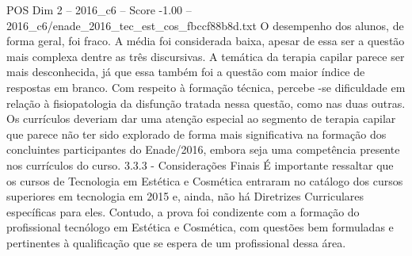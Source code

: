 \begin{textsample}{POS Dim 2 – 2016\_c6 – Score -1.00 – 2016\_c6/enade\_2016\_tec\_est\_cos\_fbccf88b8d.txt}
O desempenho dos alunos, de forma geral, foi fraco.
A média foi considerada baixa, apesar de essa ser a questão mais complexa dentre as três discursivas.
A temática da terapia capilar parece ser mais desconhecida, já que essa também foi a questão com maior índice de respostas em branco.
Com respeito à formação técnica, percebe -se dificuldade em relação à fisiopatologia da disfunção tratada nessa questão, como nas duas outras.
Os currículos deveriam dar uma atenção especial ao segmento de terapia capilar que parece não ter sido explorado de forma mais significativa na formação dos concluintes participantes do Enade/2016, embora seja uma competência presente nos currículos do curso. 3.3.3 - Considerações Finais É importante ressaltar que os cursos de Tecnologia em Estética e Cosmética entraram no catálogo dos cursos superiores em tecnologia em 2015 e, ainda, não há Diretrizes Curriculares específicas para eles.
Contudo, a prova foi condizente com a formação do profissional tecnólogo em Estética e Cosmética, com questões bem formuladas e pertinentes à qualificação que se espera de um profissional dessa área.

\end{textsample}
